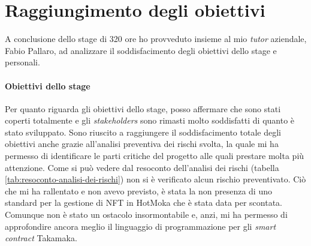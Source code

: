 
\section{Raggiungimento degli obiettivi}
A conclusione dello stage di 320 ore ho provveduto insieme al mio \textit{tutor} aziendale, Fabio Pallaro, ad analizzare il soddisfacimento degli obiettivi dello stage e personali.

\paragraph{Obiettivi dello stage}
Per quanto riguarda gli obiettivi dello stage, posso affermare che sono stati coperti totalmente e gli \textit{stakeholders} sono rimasti molto soddisfatti di quanto è stato sviluppato. 
Sono riuscito a raggiungere il soddisfacimento totale degli obiettivi anche grazie all'analisi preventiva dei rischi svolta, la quale mi ha permesso di identificare le parti critiche del progetto alle quali prestare molta più attenzione. 
Come si può vedere dal resoconto dell'analisi dei rischi (tabella \ref{tab:resoconto-analisi-dei-rischi}) non si è verificato alcun rischio preventivato. 
Ciò che mi ha rallentato e non avevo previsto, è stata la non presenza di uno standard per la gestione di NFT in HotMoka che è stata data per scontata. Comunque non è stato un ostacolo insormontabile e, anzi, mi ha permesso di approfondire ancora meglio il linguaggio di programmazione per gli \textit{smart contract} Takamaka.

